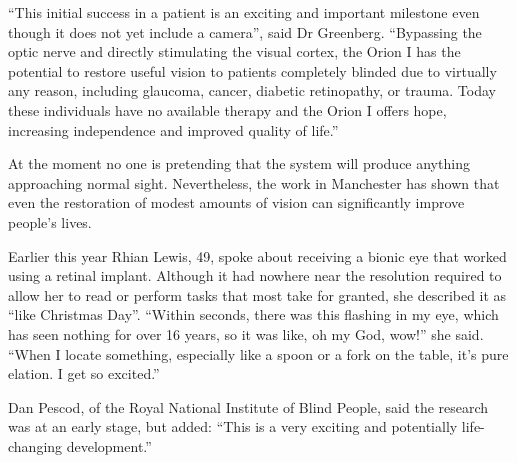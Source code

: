 \documentclass[a4paper]{article}
\begin{document}
\begin{multicols}{3}
  \enquote{This initial success in a patient is an exciting and important
  milestone even though it does not yet include a camera}, said Dr Greenberg.
  \enquote{Bypassing the optic nerve and directly stimulating the visual cortex,
  the Orion I has the potential to restore useful vision to patients completely
  blinded due to virtually any reason, including glaucoma, cancer, diabetic
  retinopathy, or trauma. Today these individuals have no available therapy and
  the Orion I offers hope, increasing independence and improved quality of
  life.}

  At the moment no one is pretending that the system will produce anything
  approaching normal sight. Nevertheless, the work in Manchester has shown that
  even the restoration of modest amounts of vision can significantly improve
  people's lives.

  Earlier this year Rhian Lewis, 49, spoke about receiving a bionic eye that
  worked using a retinal implant. Although it had nowhere near the resolution
  required to allow her to read or perform tasks that most take for granted, she
  described it as \enquote{like Christmas Day}. \enquote{Within seconds, there
  was this flashing in my eye, which has seen nothing for over 16 years, so it
  was like, oh my God, wow!} she said. \enquote{When I locate something,
  especially like a spoon or a fork on the table, it's pure elation. I get so
  excited.}

  Dan Pescod, of the Royal National Institute of Blind People, said the research
  was at an early stage, but added: \enquote{This is a very exciting and
  potentially life-changing development.}
\end{multicols}
\end{document}
